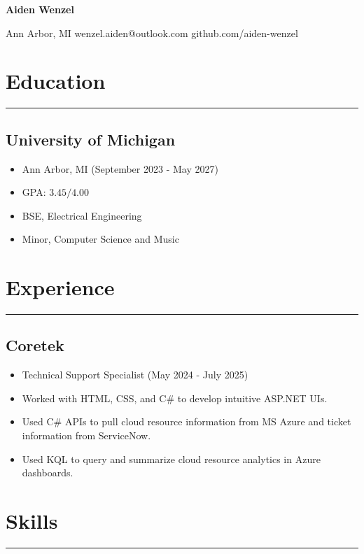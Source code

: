 \documentclass[10pt, letterpaper]{article}
\begin{document}
\thispagestyle{empty}
\begin{center}
	\textbf{\huge{Aiden Wenzel}}
	\vspace{3pt}
	
	Ann Arbor, MI \hspace{5pt} wenzel.aiden@outlook.com \hspace{5pt} github.com/aiden-wenzel
\end{center}

\section*{Education}
\hrule
\vspace{3pt}

\subsection*{University of Michigan}
\begin{itemize}[noitemsep]
	\item Ann Arbor, MI (September 2023 - May 2027)
        \item GPA: $3.45/4.00$
	\item BSE, Electrical Engineering
	\item Minor, Computer Science and Music
\end{itemize}

\section*{Experience}
\hrule
\vspace{3pt}

\subsection*{Coretek}
\begin{itemize}[noitemsep]
	\item Technical Support Specialist (May 2024 - July 2025)
	\item Worked with HTML, CSS, and C\# to develop intuitive ASP.NET UIs.
	\item Used C\# APIs to pull cloud resource information from MS Azure and ticket information from ServiceNow.
	\item Used KQL to query and summarize cloud resource analytics in Azure dashboards.
\end{itemize}

\section*{Skills}
\hrule
\vspace{3pt}
\end{document}
